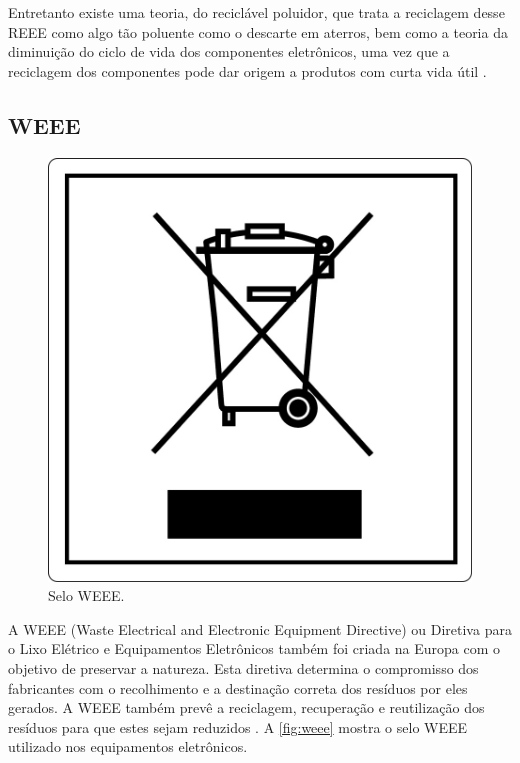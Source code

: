 Entretanto existe uma teoria, do reciclável poluidor, que trata a reciclagem desse REEE como algo tão poluente como o descarte em aterros, bem como a teoria da diminuição do ciclo de vida dos componentes eletrônicos, uma vez que a reciclagem dos componentes pode dar origem a produtos com curta vida útil \cite{garcia2015tecnologia}.

\subsection{WEEE}

\begin{figure}[htb]
	\caption{\label{fig:weee}Selo WEEE.}
	\begin{center}
	    \includegraphics[scale=0.45]{imagens/weee.jpg}
	\end{center}
\end{figure}

A WEEE (Waste Electrical and Electronic Equipment Directive) ou Diretiva para o Lixo Elétrico e Equipamentos Eletrônicos também foi criada na Europa com o objetivo de preservar a natureza. Esta diretiva determina o compromisso dos fabricantes com o recolhimento e a destinação correta dos resíduos por eles gerados. A WEEE também prevê a reciclagem, recuperação e reutilização dos resíduos para que estes sejam reduzidos \cite{neto2015ti}. A \autoref{fig:weee} mostra o selo WEEE utilizado nos equipamentos eletrônicos.

